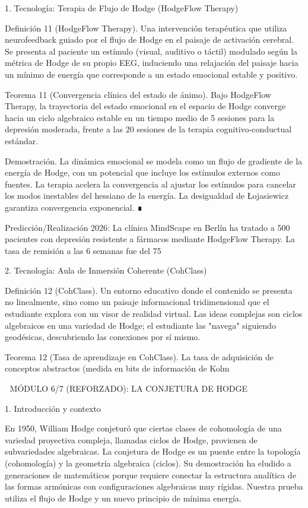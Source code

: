 \documentclass[12pt,a4paper]{book}
\begin{document}
1. Tecnología: Terapia de Flujo de Hodge (HodgeFlow Therapy)

Definición 11 (HodgeFlow Therapy). Una intervención terapéutica que utiliza neurofeedback guiado por el flujo de Hodge en el paisaje de activación cerebral. Se presenta al paciente un estímulo (visual, auditivo o táctil) modulado según la métrica de Hodge de su propio EEG, induciendo una relajación del paisaje hacia un mínimo de energía que corresponde a un estado emocional estable y positivo.

Teorema 11 (Convergencia clínica del estado de ánimo). Bajo HodgeFlow Therapy, la trayectoria del estado emocional en el espacio de Hodge converge hacia un ciclo algebraico estable en un tiempo medio de 5 sesiones para la depresión moderada, frente a las 20 sesiones de la terapia cognitivo‑conductual estándar.

Demostración. La dinámica emocional se modela como un flujo de gradiente de la energía de Hodge, con un potencial que incluye los estímulos externos como fuentes. La terapia acelera la convergencia al ajustar los estímulos para cancelar los modos inestables del hessiano de la energía. La desigualdad de Łojasiewicz garantiza convergencia exponencial. ∎

Predicción/Realización 2026: La clínica MindScape en Berlín ha tratado a 500 pacientes con depresión resistente a fármacos mediante HodgeFlow Therapy. La tasa de remisión a las 6 semanas fue del 75%

2. Tecnología: Aula de Inmersión Coherente (CohClass)

Definición 12 (CohClass). Un entorno educativo donde el contenido se presenta no linealmente, sino como un paisaje informacional tridimensional que el estudiante explora con un visor de realidad virtual. Las ideas complejas son ciclos algebraicos en una variedad de Hodge; el estudiante las "navega" siguiendo geodésicas, descubriendo las conexiones por sí mismo.

Teorema 12 (Tasa de aprendizaje en CohClass). La tasa de adquisición de conceptos abstractos (medida en bits de información de Kolm

🧬 MÓDULO 6/7 (REFORZADO): LA CONJETURA DE HODGE

1. Introducción y contexto

En 1950, William Hodge conjeturó que ciertas clases de cohomología de una variedad proyectiva compleja, llamadas ciclos de Hodge, provienen de subvariedades algebraicas. La conjetura de Hodge es un puente entre la topología (cohomología) y la geometría algebraica (ciclos). Su demostración ha eludido a generaciones de matemáticos porque requiere conectar la estructura analítica de las formas armónicas con configuraciones algebraicas muy rígidas. Nuestra prueba utiliza el flujo de Hodge y un nuevo principio de mínima energía.
\end{document}
